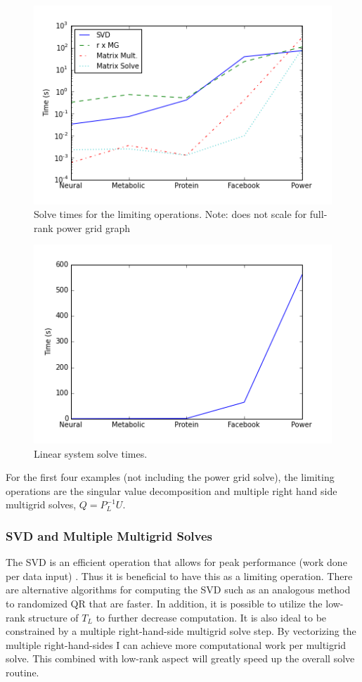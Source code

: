 \documentclass{article}
\begin{document}
\begin{figure}
\centering
\includegraphics[width = \linewidth]{operationtimes.png}
\caption{Solve times for the limiting operations. Note: does not scale for full-rank power grid graph}
\end{figure}

\begin{figure}
\centering
\includegraphics[width = \linewidth]{stimes.png}
\caption{Linear system solve times.}
\end{figure}

For the first four examples (not including the power grid solve), the limiting operations are the singular value decomposition and multiple right hand side multigrid solves, $Q = P_L^{-1}U$. 
\subsubsection{SVD and Multiple Multigrid Solves}
The SVD is an efficient operation that allows for peak performance (work done per data input) \cite{Berry:2006}. Thus it is beneficial to have this as a limiting operation. There are alternative algorithms for computing the SVD such as an analogous method to randomized QR \cite{Halko:2011} that are faster. In addition, it is possible to utilize the low-rank structure of $T_L$ to further decrease computation. It is also ideal to be constrained by a multiple right-hand-side multigrid solve step. By vectorizing the multiple right-hand-sides I can achieve more computational work per multigrid solve. This combined with low-rank aspect will greatly speed up the overall solve routine.
\end{document}
